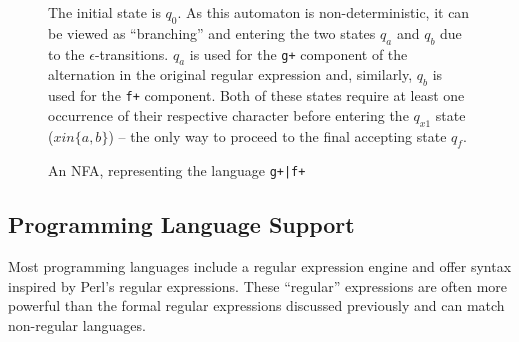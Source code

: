 \documentclass[a4paper,openany,12pt]{book}
\begin{document}
\begin{figure}[H]
	\begin{MyMdframed}
	\vspace{0.5em}
 

\caption{\label{figure:nfa:1} An NFA, representing the language \texttt{g+|f+}}
\vspace{0.5em}
\captionsetup{style=default}

		
\vspace{0.5em}

The initial state is $q_0$. As this automaton is non-deterministic, it can be viewed as ``branching'' and entering the two states $q_a$ and $q_b$ due to the $\epsilon$-transitions. $q_a$ is used for the \texttt{g+} component of the alternation in the original regular expression and, similarly, $q_b$ is used for the \texttt{f+} component. Both of these states require at least one occurrence of their respective character before entering the $q_{x1}$ state ($x in \{a, b\}$) -- the only way to proceed to the final accepting state $q_f$. 

\vspace{0.5em}

\end{MyMdframed}
\end{figure}

\subsection{Programming Language Support}

Most programming languages include a regular expression engine and offer syntax inspired by Perl's regular expressions. These ``regular'' expressions are often more powerful than the formal regular expressions discussed previously and can match non-regular languages.
\end{document}
